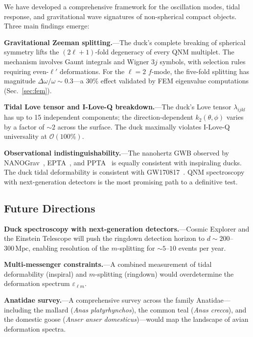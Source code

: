 \documentclass[aps,prd,twocolumn,superscriptaddress,nofootinbib]{revtex4-2}
\newcommand{\order}[1]{\mathcal{O}(#1)}
\begin{document}
We have developed a comprehensive framework for the oscillation modes,
tidal response, and gravitational wave signatures of non-spherical compact
objects.  Three main findings emerge:

\textbf{Gravitational Zeeman splitting.}---The duck's complete breaking of
spherical symmetry lifts the $(2\ell+1)$-fold degeneracy of every QNM
multiplet.  The mechanism involves Gaunt integrals and Wigner $3j$ symbols,
with selection rules requiring even-$\ell'$ deformations.  For the $\ell=2$
$f$-mode, the five-fold splitting has magnitude
$\Delta\omega/\omega \sim 0.3$---a 30\% effect validated by FEM eigenvalue
computations (Sec.~\ref{sec:fem}).

\textbf{Tidal Love tensor and I-Love-Q breakdown.}---The duck's Love tensor
$\lambda_{ijkl}$ has up to 15 independent components; the direction-dependent
$k_2(\theta,\phi)$ varies by a factor of $\sim 2$ across the surface.  The
duck maximally violates I-Love-Q universality at $\order{100\%}$.

\textbf{Observational indistinguishability.}---The nanohertz GWB observed by
NANOGrav~\cite{NANOGrav2023}, EPTA~\cite{EPTA2023}, and
PPTA~\cite{PPTA2023} is equally consistent with inspiraling ducks.  The
duck tidal deformability is consistent with GW170817~\cite{Abbott2017GW170817,
Abbott2018GW170817tidal}.  QNM spectroscopy with next-generation detectors
is the most promising path to a definitive test.


\subsection{Future Directions}

\textbf{Duck spectroscopy with next-generation detectors.}---Cosmic Explorer
and the Einstein Telescope will push the ringdown detection horizon to
$d \sim 200$--$300\,\mathrm{Mpc}$, enabling resolution of the $m$-splitting
for $\sim 5$--$10$ events per year.

\textbf{Multi-messenger constraints.}---A combined measurement of tidal
deformability (inspiral) and $m$-splitting (ringdown) would overdetermine the
deformation spectrum $\varepsilon_{\ell m}$.

\textbf{Anatidae survey.}---A comprehensive survey across the family
Anatidae---including the mallard (\textit{Anas platyrhynchos}), the common
teal (\textit{Anas crecca}), and the domestic goose (\textit{Anser anser
domesticus})---would map the landscape of avian deformation spectra.
\end{document}
